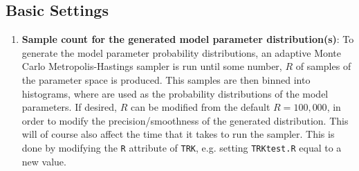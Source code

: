 \documentclass[12pt]{article}
\newcommand{\li}{\lstinline}
\begin{document}
\subsection{Basic Settings}
\begin{enumerate}
    \item \textbf{Sample count for the generated model parameter distribution(s)}: To generate the model parameter probability distributions, an adaptive Monte Carlo Metropolis-Hastings sampler is run until some number, $R$ of samples of the parameter space is produced. This samples are then binned into histograms, where are used as the probability distributions of the model parameters. If desired, $R$ can be modified from the default $R=100,000$, in order to modify the precision/smoothness of the generated distribution. This will of course also affect the time that it takes to run the sampler. This is done by modifying the \li{R} attribute of \li{TRK}, e.g. setting \li{TRKtest.R} equal to a new value.
\end{enumerate}
\end{document}
